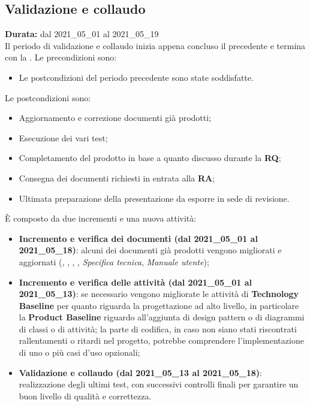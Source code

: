 \subsection{Validazione e collaudo}
\label{validazione_e_collaudo}
\textbf{Durata:} dal 2021\_05\_01 al 2021\_05\_19\\
Il periodo di validazione e collaudo inizia appena concluso il precedente e termina con la .
Le precondizioni sono:
\begin{itemize}
    \item Le postcondizioni del periodo precedente sono state soddisfatte.
\end{itemize}
Le postcondizioni sono:
\begin{itemize}
    \item Aggiornamento e correzione documenti già prodotti;
    \item Esecuzione dei vari test;
    \item Completamento del prodotto in base a quanto discusso durante la \textbf{RQ};
    \item Consegna dei documenti richiesti in entrata alla \textbf{RA};
    \item Ultimata preparazione della presentazione da esporre in sede di revisione.
\end{itemize}
È composto da due incrementi e una nuova attività:
\begin{itemize}
    \item \textbf{Incremento e verifica dei documenti (dal 2021\_05\_01 al 2021\_05\_18)}: alcuni dei documenti già prodotti vengono migliorati e aggiornati ({\NdP}, {\PdP}, {\Glossario}, {\PdQ}, \textit{Specifica tecnica}, \textit{Manuale utente}); 
    \item \textbf{Incremento e verifica delle attività (dal 2021\_05\_01 al 2021\_05\_13)}: se necessario vengono migliorate le attività di \textbf{Technology Baseline} per quanto riguarda la progettazione ad alto livello, in particolare la \textbf{Product Baseline} riguardo all'aggiunta di design pattern o di diagrammi di classi o di attività; la parte di codifica, in caso non siano stati riscontrati rallentamenti o ritardi nel progetto, potrebbe comprendere l'implementazione di uno o più casi d'uso opzionali;
    \item \textbf{Validazione e collaudo (dal 2021\_05\_13 al 2021\_05\_18)}: realizzazione degli ultimi test, con successivi controlli finali per garantire un buon livello di qualità e correttezza.
\end{itemize}
